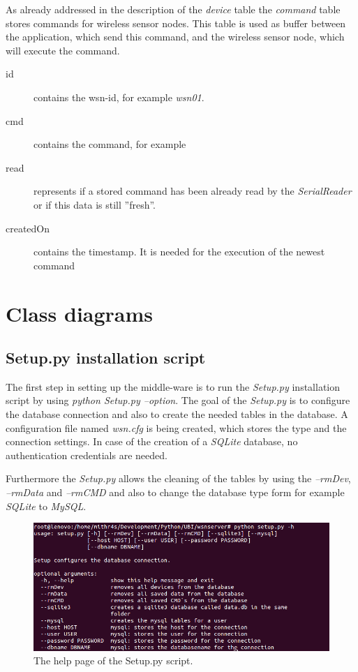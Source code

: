 As already addressed in the description of the \textit{device} table the \textit{command} table stores commands for wireless sensor nodes. This table is used as buffer between the application, which send this command, and the wireless sensor node, which will execute the command.

\begin{description}
	\item[id] contains the wsn-id, for example \textit{wsn01}.
	\item[cmd] contains the command, for example \textit{}
	\item[read] represents if a stored command has been already read by the \textit{SerialReader} or if this data is still ”fresh”.
	\item[createdOn] contains the timestamp. It is needed for the execution of the newest command
\end{description}

\newpage
\section{Class diagrams}
\subsection{Setup.py installation script}
The first step in setting up the middle-ware is to run the \textit{Setup.py} installation script by using \textit{python Setup.py --option}. The goal of the \textit{Setup.py} is to configure the database connection and also to create the needed tables in the database. A configuration file named \textit{wsn.cfg} is being created, which stores the type and the connection settings. In case of the creation of a \textit{SQLite} database, no authentication credentials are needed.

Furthermore the \textit{Setup.py} allows the cleaning of the tables by using the \textit{--rmDev},  \textit{--rmData} and \textit{--rmCMD} and also to change the database type form for example \textit{SQLite} to \textit{MySQL}.

\begin{figure}[H]
	\centering
	\includegraphics[width=1.0\textwidth]{pic/Setuppy.png}%
    \caption{The help page of the Setup.py script.}
    \label{Setuppypic}%
\end{figure}

